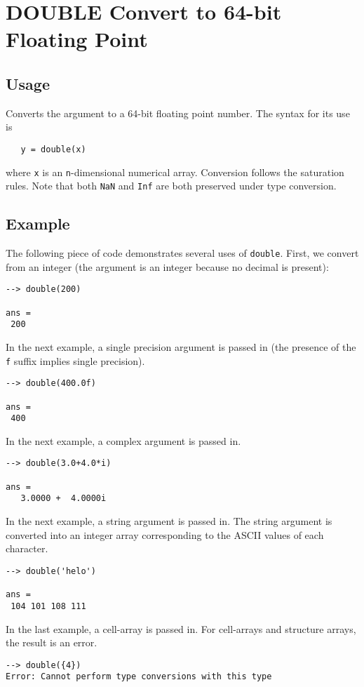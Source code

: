 \section{DOUBLE Convert to 64-bit Floating Point}

\subsection{Usage}

Converts the argument to a 64-bit floating point number.  The syntax
for its use is
\begin{verbatim}
   y = double(x)
\end{verbatim}
where \verb|x| is an \verb|n|-dimensional numerical array.  Conversion follows the 
saturation rules.  Note that both \verb|NaN| and \verb|Inf| are both preserved under type conversion.
\subsection{Example}

The following piece of code demonstrates several uses of \verb|double|.  First, 
we convert from an integer (the argument is an integer because no decimal is present):
\begin{verbatim}
--> double(200)

ans = 
 200 
\end{verbatim}
In the next example, a single precision argument is passed in (the presence of 
the \verb|f| suffix implies single precision).
\begin{verbatim}
--> double(400.0f)

ans = 
 400 
\end{verbatim}
In the next example, a complex argument is passed in.
\begin{verbatim}
--> double(3.0+4.0*i)

ans = 
   3.0000 +  4.0000i 
\end{verbatim}
In the next example, a string argument is passed in.  The string argument 
is converted into an integer array corresponding to the ASCII values of each character.
\begin{verbatim}
--> double('helo')

ans = 
 104 101 108 111 
\end{verbatim}
In the last example, a cell-array is passed in.  For cell-arrays 
and structure arrays, the result is an error.
\begin{verbatim}
--> double({4})
Error: Cannot perform type conversions with this type
\end{verbatim}
